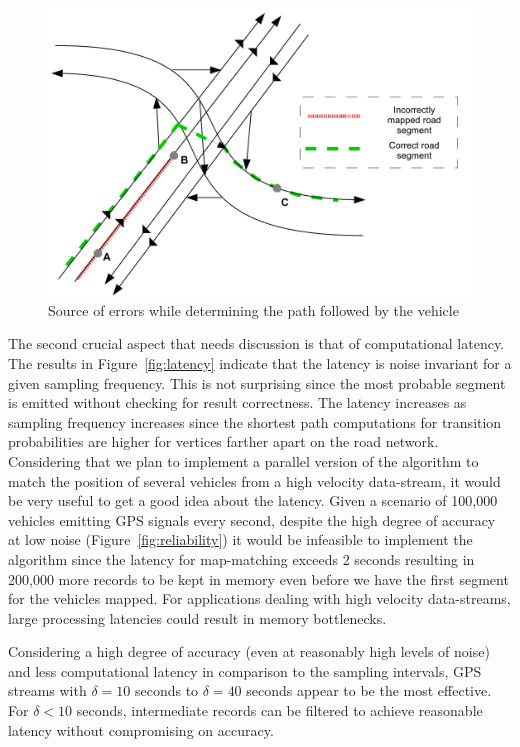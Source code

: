 \documentclass{wscpaperproc}
\theoremstyle{wsc}
\begin{document}
\begin{figure}[!htbp]
 \centering
 \includegraphics[scale=0.58]{complexity.pdf}
 \caption{Source of errors while determining the path followed by the vehicle}
 \label{fig:complexity}
\end{figure} 

The second crucial aspect that needs discussion is that of computational latency. The results in Figure~\ref{fig:latency} indicate that the latency is noise invariant for a given sampling frequency. This is not surprising since the most probable segment is emitted without checking for result correctness. The latency increases as sampling frequency increases since the shortest path computations for transition probabilities are higher for vertices farther apart on the road network. Considering that we plan to implement a parallel version of the algorithm to match the position of several vehicles from a high velocity data-stream, it would be very useful to get a good idea about the latency. Given a scenario of 100,000 vehicles emitting GPS signals every second, despite the high degree of accuracy at low noise (Figure~\ref{fig:reliability}) it would be infeasible to implement the algorithm since the latency for map-matching exceeds 2 seconds resulting in 200,000 more records to be kept in memory even before we have the first segment for the vehicles mapped. For applications dealing with high velocity data-streams, large processing latencies could result in memory bottlenecks.

Considering a high degree of accuracy (even at reasonably high levels of noise) and less computational latency in comparison to the sampling intervals, GPS streams with $\delta=10$ seconds to $\delta=40$ seconds appear to be the most effective. For $\delta<10$ seconds, intermediate records can be filtered to achieve reasonable latency without compromising on accuracy.
\end{document}

